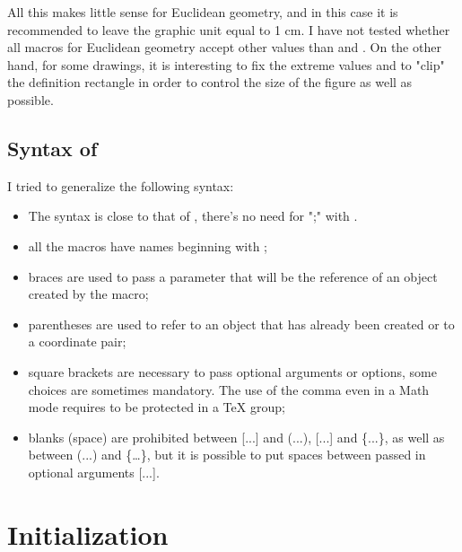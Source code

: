 All this makes little sense for Euclidean geometry, and in this case it is recommended to leave the graphic unit equal to 1 cm. I have not tested whether all macros for Euclidean geometry accept other values than  and . On the other hand, for some drawings, it is interesting to fix the extreme values and to "clip" the definition rectangle in order to control the size of the figure as well as possible.

\subsection{Syntax of }

I tried to generalize the following syntax:
\begin{itemize}
  \item The syntax is close to that of \LATEX, there's no need for ";" with .
  \item all the macros have names beginning with ;
  \item braces are used to pass a parameter that will be the reference of an object created by the macro;
  \item parentheses are used to refer to an object that has already been created or to a coordinate pair;
  \item square brackets are necessary to pass optional arguments or options, some choices are sometimes mandatory. The use of the comma even in a Math mode requires to be protected in a TeX group;
  \item blanks (space) are prohibited between [...] and (...), [...] and \{...\},  as well as between (...) and \{…\}, but it is possible to put spaces between passed in optional arguments [...].    
\end{itemize}
 
\section{Initialization } 
